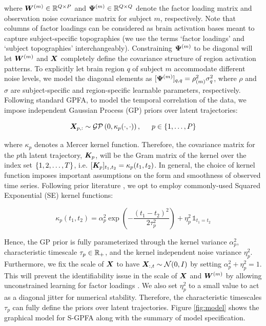 where $\bm{W}^{(m)} \in \mathbb{R}^{Q \times P}$ and $\bm{\Psi}^{(m)} \in \mathbb{R}^{Q \times Q}$ denote the factor loading matrix and observation noise covariance matrix for subject $m$, respectively. Note that columns of factor loadings can be considered as brain activation bases meant to capture subject-specific topographies (we use the terms `factor loadings' and `subject topographies' interchangeably). Constraining $\bm{\Psi}^{(m)}$ to be diagonal will let $\bm{W}^{(m)}$ and $\bm{X}$ completely define the covariance structure of region activation patterns.
To explicitly let brain region $q$ of subject $m$ accommodate different noise levels, we model the diagonal elements as $[\bm{\Psi}^{(m)}]_{q, q} = \rho_{(m)}^2 \sigma_{q}^2$, where $\rho$ and $\sigma$ are subject-specific and region-specific learnable parameters, respectively. Following standard GPFA, to model the temporal correlation of the data, we impose independent Gaussian Process (GP) priors over latent trajectories:

\begin{equation}
    \bm{X}_{p, :} \sim \mathcal{GP}\left(0, \kappa_p(\cdot , \cdot) \right), \hspace{1.5em} p \in \{1, \ldots, P\}
\end{equation}

where $\kappa_p$ denotes a Mercer kernel function. Therefore, the covariance matrix for the $p$th latent trajectory, $\bm{K}_p$, will be the Gram matrix of the kernel over the index set $\{1, 2, \ldots, T\}$, i.e. $[\bm{K}_p]_{t_1,t_2} = \kappa_p(t_1, t_2)$. In general, the choice of kernel function imposes important assumptions on the form and smoothness of observed time series. Following prior literature \cite{infraslow,lfgp}, we opt to employ commonly-used Squared Exponential (SE) kernel functions:

\begin{equation}
    \kappa_p (t_1, t_2) = \alpha_p^2 \exp \left( -\frac{(t_1 - t_2)^2}{2\tau_p^2} \right) + \eta_p^2 \, \mathds{1}_{t_1=t_2}
\end{equation}

Hence, the GP prior is fully parameterized through the kernel variance $\alpha_p^2$, characteristic timescale $\tau_p \in \mathbb{R}_+$, and the kernel independent noise variance $\eta_p^2$. Furthermore, we fix the scale of $\bm{X}$ to have $\bm{X}_{:,t} \sim \mathcal{N}(0, I)$ by setting $\alpha_p^2 + \eta_p^2 = 1$. This will prevent the identifiability issue in the scale of $\bm{X}$ and $\bm{W}^{(m)}$ by allowing unconstrained learning for factor loadings \cite{gpfa,infraslow,lfgp}. We also set $\eta_p^2$ to a small value to act as a diagonal jitter for numerical stability. Therefore, the characteristic timescales $\tau_p$ can fully define the priors over latent trajectories. Figure \ref{fig:model} shows the graphical model for S-GPFA along with the summary of model specification.

